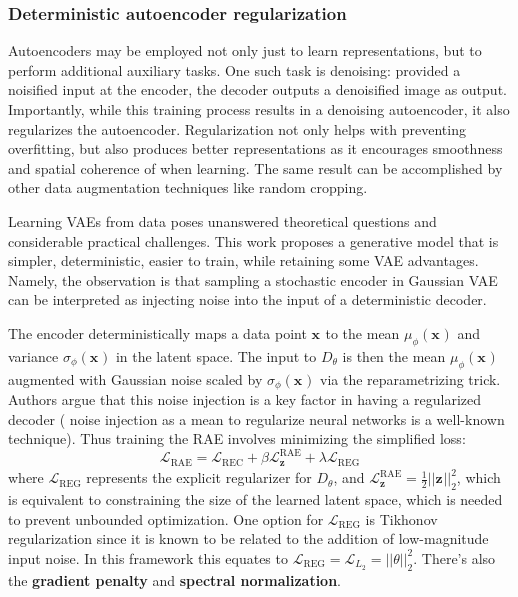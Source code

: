 \subsubsection{Deterministic autoencoder regularization}
\label{ae-regularization}
Autoencoders may be employed not only just to learn representations, 
but to perform additional auxiliary tasks.
One such task is denoising: provided a noisified input at the encoder,
the decoder outputs a denoisified image as output.
Importantly, while this training process results in a denoising autoencoder,
it also regularizes the autoencoder.
Regularization not only helps with preventing overfitting, but also
produces better representations as it encourages smoothness
and spatial coherence of when learning.
The same result can be accomplished by other data augmentation techniques
like random cropping.


Learning VAEs from data poses unanswered theoretical questions and considerable practical challenges.
This work proposes a generative model that is simpler, deterministic, easier to train,
while retaining some VAE advantages.
Namely, the observation is that sampling a stochastic encoder in Gaussian VAE can be interpreted as injecting
noise into the input of a deterministic decoder.

The encoder deterministically maps a data point $ \bm{x}_{}  $ to
the mean $ \mu_{ \phi } (\bm{x}_{})  $ and variance $ \sigma_{ \phi } ( \bm{x}_{})  $
in the latent space.
The input to $ D_{ \theta }  $ is then the mean $ \mu_{ \phi } (\bm{x}_{})  $
augmented with Gaussian noise scaled by $ \sigma_{ \phi } (\bm{x}_{})  $
via the reparametrizing trick.
Authors argue that this noise injection is a key factor in having a regularized decoder (
noise injection as a mean to regularize neural networks is a well-known technique).
Thus training the RAE involves minimizing the simplified loss:
\begin{equation}
		\mathcal{L}_{ \text{RAE} } = 
\mathcal{L}_{ \text{REC} } + \beta \mathcal{L}^{ \text{RAE} }_{ \bm{z}_{} } 
+ \lambda \mathcal{L}_{ \text{REG} }
\end{equation}
where $ \mathcal{L}_{ \text{REG} }  $ represents the explicit regularizer for $ D_{ \theta }  $,
and $ \mathcal{L}^{ \text{RAE} }_{ \bm{z}_{} } = \frac{1}{2} ||\bm{z}_{}||_{ 2 }^{ 2 }  $,
which is equivalent to constraining the size of the learned latent space, which is needed
to prevent unbounded optimization.
One option for $ \mathcal{L}_{ \text{REG} }  $ is Tikhonov regularization
since it is known to be related to the addition of low-magnitude input noise.
In this framework this equates to 
$ \mathcal{L}_{ \text{REG} } = \mathcal{L}_{ L_{ 2 } } = ||\theta||^{ 2 }_{ 2 } $.
There's also the \textbf{gradient penalty} and
\textbf{spectral normalization}.



